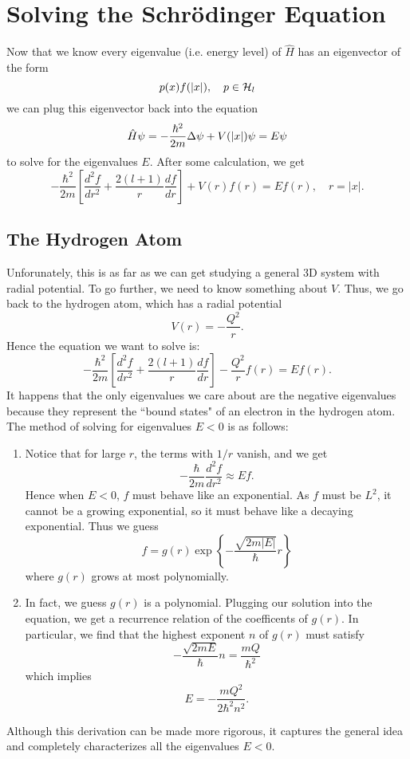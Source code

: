 \section{Solving the Schr\"{o}dinger Equation}
Now that we know every eigenvalue (i.e. energy level) of $\hat{H}$ has an eigenvector of the form
\[
    p(x)f(|x|), \quad p \in {\mathcal H}_l
\]
we can plug this eigenvector back into the equation
\[
    \hat{H}\psi = -\frac{\hbar^2}{2m}\Delta\psi + V(|x|)\psi = E\psi
\]
to solve for the eigenvalues $E$. After some calculation, we get
\[
    - \frac{\hbar^2}{2m}\left[ \frac{d^2f}{dr^2} + \frac{2(l+1)}{r} \frac{df}{dr} \right] + V(r)f(r) = Ef(r), \quad r = |x|.
\]
\subsection{The Hydrogen Atom}
Unforunately, this is as far as we can get studying a general 3D system with radial potential. To go further, we need to know something about $V$. Thus, we go back to the hydrogen atom, which has a radial potential
\[
    V(r) = - \frac{Q^2}{r}.
\]
Hence the equation we want to solve is:
\[
    - \frac{\hbar^2}{2m}\left[ \frac{d^2f}{dr^2} + \frac{2(l+1)}{r} \frac{df}{dr} \right] - \frac{Q^2}{r}f(r) = Ef(r).
\]
It happens that the only eigenvalues we care about are the negative eigenvalues because they represent the ``bound states" of an electron in the hydrogen atom. The method of solving for eigenvalues $E < 0$ is as follows:
\begin{enumerate}
    \item Notice that for large $r$, the terms with $1/r$ vanish, and we get
        \[
            - \frac{\hbar}{2m} \frac{d^2f}{dr^2} \approx Ef.
        \]
        Hence when $E < 0$, $f$ must behave like an exponential. As $f$ must be $L^2$, it cannot be a growing exponential, so it must behave like a decaying exponential. Thus we guess
        \[
            f = g(r) \exp\left\{ - \frac{\sqrt{2m|E|}}{\hbar}r\right\}
        \]
        where $g(r)$ grows at most polynomially.

    \item In fact, we guess $g(r)$ is a polynomial. Plugging our solution into the equation, we get a recurrence relation of the coefficents of $g(r)$. In particular, we find that the highest exponent $n$ of $g(r)$ must satisfy
        \[
            - \frac{\sqrt{2mE}}{\hbar} n = \frac{mQ}{\hbar^2}
        \]
        which implies
        \[
            E = - \frac{mQ^2}{2\hbar^2n^2}.
        \]
\end{enumerate}
Although this derivation can be made more rigorous, it captures the general idea and completely characterizes all the eigenvalues $E < 0$.
